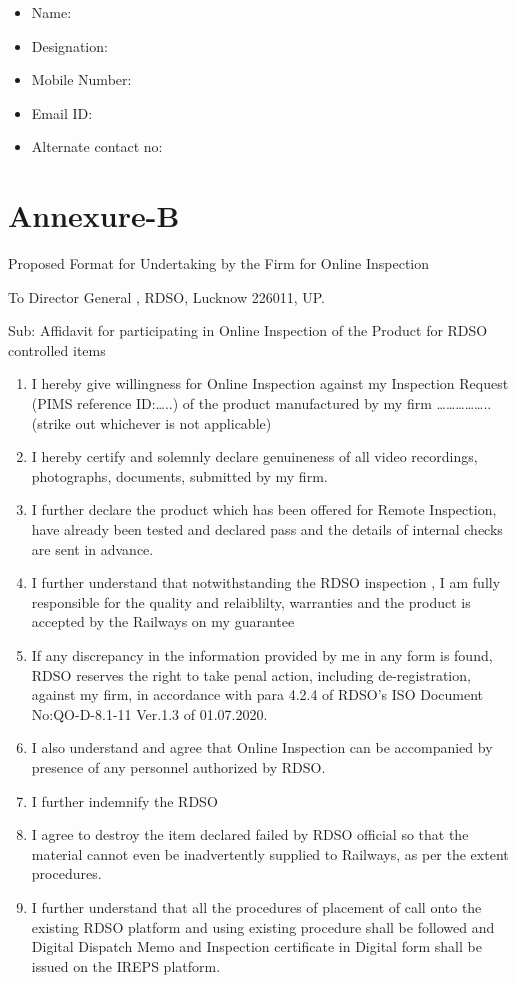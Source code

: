 \documentclass[
]{article}
\providecommand{\tightlist}{%
  \setlength{\itemsep}{0pt}\setlength{\parskip}{0pt}}
\begin{document}
\begin{itemize}
\tightlist
\item
  Name:
\item
  Designation:
\item
  Mobile Number:
\item
  Email ID:
\item
  Alternate contact no:
\end{itemize}

\newpage

\hypertarget{annexure-b}{%
\section{Annexure-B}\label{annexure-b}}

Proposed Format for Undertaking by the Firm for Online Inspection

To Director General , RDSO, Lucknow 226011, UP.

Sub: Affidavit for participating in Online Inspection of the Product for
RDSO controlled items

\begin{enumerate}
\def\labelenumi{\arabic{enumi}.}
\item
  I hereby give willingness for Online Inspection against my Inspection
  Request (PIMS reference ID:\ldots..) of the product manufactured by my
  firm \ldots\ldots\ldots\ldots\ldots.. (strike out whichever is not
  applicable)
\item
  I hereby certify and solemnly declare genuineness of all video
  recordings, photographs, documents, submitted by my firm.
\item
  I further declare the product which has been offered for Remote
  Inspection, have already been tested and declared pass and the details
  of internal checks are sent in advance.
\item
  I further understand that notwithstanding the RDSO inspection , I am
  fully responsible for the quality and relaiblilty, warranties and the
  product is accepted by the Railways on my guarantee
\item
  If any discrepancy in the information provided by me in any form is
  found, RDSO reserves the right to take penal action, including
  de-registration, against my firm, in accordance with para 4.2.4 of
  RDSO's ISO Document No:QO-D-8.1-11 Ver.1.3 of 01.07.2020.
\item
  I also understand and agree that Online Inspection can be accompanied
  by presence of any personnel authorized by RDSO.
\item
  I further indemnify the RDSO
\item
  I agree to destroy the item declared failed by RDSO official so that
  the material cannot even be inadvertently supplied to Railways, as per
  the extent procedures.
\item
  I further understand that all the procedures of placement of call onto
  the existing RDSO platform and using existing procedure shall be
  followed and Digital Dispatch Memo and Inspection certificate in
  Digital form shall be issued on the IREPS platform.
\end{enumerate}
\end{document}
